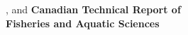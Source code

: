 \thispagestyle{fancyplain}
\noindent
\begin{flushleft}
\LARGE
\textbf{\trTitle{}}
\vfill
\Large
\trAuthALong{}, and \trAuthBLong{}
\vfill
\trAddy{}
\vfill
\trYear{}
\vfill
\LARGE
\textbf{Canadian Technical Report of\\
Fisheries and Aquatic Sciences \trReportNum{}}
\cfoot{}
\end{flushleft}
\clearpage
